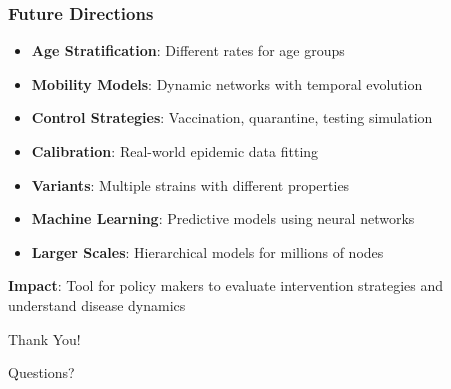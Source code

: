 \documentclass{beamer}
\begin{document}
\begin{frame}
\frametitle{Future Directions}

\begin{itemize}
    \item \textbf{Age Stratification}: Different rates for age groups
    \item \textbf{Mobility Models}: Dynamic networks with temporal evolution
    \item \textbf{Control Strategies}: Vaccination, quarantine, testing simulation
    \item \textbf{Calibration}: Real-world epidemic data fitting
    \item \textbf{Variants}: Multiple strains with different properties
    \item \textbf{Machine Learning}: Predictive models using neural networks
    \item \textbf{Larger Scales}: Hierarchical models for millions of nodes
\end{itemize}

\vspace{1cm}

\textbf{Impact}: Tool for policy makers to evaluate intervention strategies and understand disease dynamics
\end{frame}

\begin{frame}
\centering
\Huge Thank You!

\Large Questions?
\end{frame}
\end{document}
